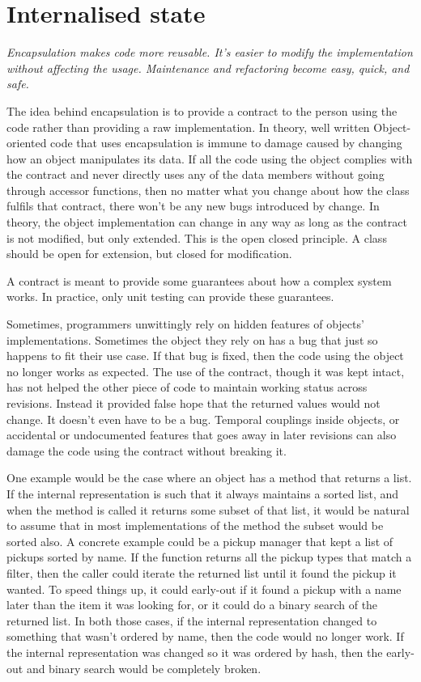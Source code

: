 \section{Internalised state}
\emph{Encapsulation makes code more reusable. It's
easier to modify the implementation without affecting the usage. Maintenance
and refactoring become easy, quick, and safe.} \\ \hfill

The idea behind encapsulation is to provide a contract to the person using the
code rather than providing a raw implementation. In theory, well written
Object-oriented code that uses encapsulation is immune to damage caused by
changing how an object manipulates its data. If all the code using the object
complies with the contract and never directly uses any of the data members
without going through accessor functions, then no matter what you change about
how the class fulfils that contract, there won't be any new bugs introduced by
change. In theory, the object implementation can change in any way as long as
the contract is not modified, but only extended. This is the open closed
principle. A class should be open for extension, but closed for modification.

A contract is meant to provide some guarantees about how a complex system
works. In practice, only unit testing can provide these guarantees.

Sometimes, programmers unwittingly rely on hidden features of objects'
implementations. Sometimes the object they rely on has a bug that just so
happens to fit their use case. If that bug is fixed, then the code using the
object no longer works as expected. The use of the contract, though it was kept
intact, has not helped the other piece of code to maintain working status
across revisions. Instead it provided false hope that the returned values would
not change. It doesn't even have to be a bug. Temporal couplings inside
objects, or accidental or undocumented features that goes away in later
revisions can also damage the code using the contract without breaking it.

One example would be the case where an object has a method that returns a list.
If the internal representation is such that it always maintains a sorted list,
and when the method is called it returns some subset of that list, it would be
natural to assume that in most implementations of the method the subset would
be sorted also. A concrete example could be a pickup manager that kept a list
of pickups sorted by name. If the function returns all the pickup types that
match a filter, then the caller could iterate the returned list until it found
the pickup it wanted. To speed things up, it could early-out if it found a
pickup with a name later than the item it was looking for, or  it could do a
binary search of the returned list. In both those cases, if the internal
representation changed to something that wasn't ordered by name, then the code
would no longer work. If the internal representation was changed so it was
ordered by hash, then the early-out and binary search would be completely
broken.

